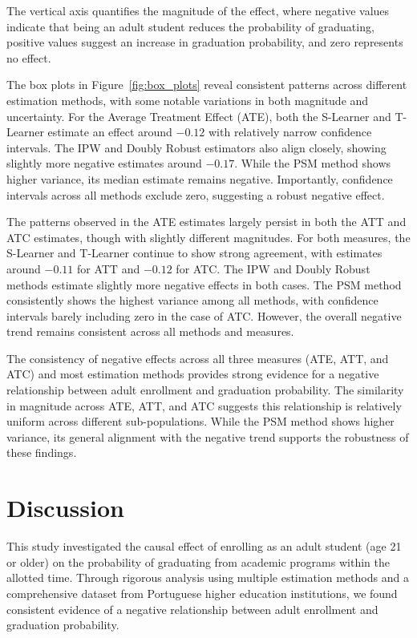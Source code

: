 \documentclass{article}
\begin{document}
The vertical axis quantifies the magnitude of the effect, where negative values indicate that being an adult student reduces the probability of graduating, positive values suggest an increase in graduation probability, and zero represents no effect.

The box plots in Figure~\ref{fig:box_plots} reveal consistent patterns across different estimation methods, with some notable variations in both magnitude and uncertainty. For the Average Treatment Effect (ATE), both the S-Learner and T-Learner estimate an effect around $-0.12$ with relatively narrow confidence intervals. The IPW and Doubly Robust estimators also align closely, showing slightly more negative estimates around $-0.17$. While the PSM method shows higher variance, its median estimate remains negative. Importantly, confidence intervals across all methods exclude zero, suggesting a robust negative effect.

The patterns observed in the ATE estimates largely persist in both the ATT and ATC estimates, though with slightly different magnitudes. For both measures, the S-Learner and T-Learner continue to show strong agreement, with estimates around $-0.11$ for ATT and $-0.12$ for ATC. The IPW and Doubly Robust methods estimate slightly more negative effects in both cases. The PSM method consistently shows the highest variance among all methods, with confidence intervals barely including zero in the case of ATC. However, the overall negative trend remains consistent across all methods and measures.

The consistency of negative effects across all three measures (ATE, ATT, and ATC) and most estimation methods provides strong evidence for a negative relationship between adult enrollment and graduation probability. The similarity in magnitude across ATE, ATT, and ATC suggests this relationship is relatively uniform across different sub-populations. While the PSM method shows higher variance, its general alignment with the negative trend supports the robustness of these findings.

\section{Discussion}

This study investigated the causal effect of enrolling as an adult student (age 21 or older) on the probability of graduating from academic programs within the allotted time. Through rigorous analysis using multiple estimation methods and a comprehensive dataset from Portuguese higher education institutions, we found consistent evidence of a negative relationship between adult enrollment and graduation probability.
\end{document}
